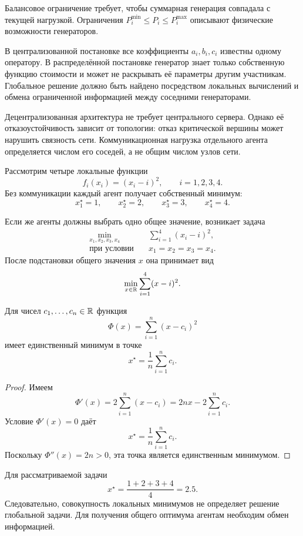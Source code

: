 Балансовое ограничение требует, чтобы суммарная генерация совпадала
с текущей нагрузкой. Ограничения
\(P_i^{\min}\le P_i\le P_i^{\max}\) описывают физические возможности
генераторов.

В централизованной постановке все коэффициенты \(a_i,b_i,c_i\)
известны одному оператору. В распределённой постановке генератор
знает только собственную функцию стоимости и может не раскрывать её
параметры другим участникам. Глобальное решение должно быть найдено
посредством локальных вычислений и обмена ограниченной информацией
между соседними генераторами.

Децентрализованная архитектура не требует центрального сервера.
Однако её отказоустойчивость зависит от топологии: отказ критической
вершины может нарушить связность сети. Коммуникационная нагрузка
отдельного агента определяется числом его соседей, а не общим числом
узлов сети.



Рассмотрим четыре локальные функции
\[
    f_i(x_i)=(x_i-i)^2,
    \qquad i=1,2,3,4.
\]
Без коммуникации каждый агент получает собственный минимум:
\[
    x_1^\star=1,
    \qquad
    x_2^\star=2,
    \qquad
    x_3^\star=3,
    \qquad
    x_4^\star=4.
\]

Если же агенты должны выбрать одно общее значение, возникает задача
\[
    \begin{aligned}
        \min_{x_1,x_2,x_3,x_4}
        \quad&
        \sum_{i=1}^{4}(x_i-i)^2,
        \\
        \text{при условии}
        \quad&
        x_1=x_2=x_3=x_4.
    \end{aligned}
\]
После подстановки общего значения \(x\) она принимает вид
\[
    \min_{x\in\mathbb{R}}
    \sum_{i=1}^{4}(x-i)^2.
\]

\begin{lemma}
Для чисел \(c_1,\ldots,c_n\in\mathbb{R}\) функция
\[
    \Phi(x)=\sum_{i=1}^{n}(x-c_i)^2
\]
имеет единственный минимум в точке
\[
    x^\star=\frac{1}{n}\sum_{i=1}^{n}c_i.
\]
\end{lemma}

\begin{proof}
Имеем
\[
    \Phi'(x)
    =
    2\sum_{i=1}^{n}(x-c_i)
    =
    2n x-2\sum_{i=1}^{n}c_i.
\]
Условие \(\Phi'(x)=0\) даёт
\[
    x^\star
    =
    \frac{1}{n}\sum_{i=1}^{n}c_i.
\]
Поскольку \(\Phi''(x)=2n>0\), эта точка является единственным
минимумом.
\end{proof}

Для рассматриваемой задачи
\[
    x^\star
    =
    \frac{1+2+3+4}{4}
    =
    2.5.
\]
Следовательно, совокупность локальных минимумов не определяет
решение глобальной задачи. Для получения общего оптимума агентам
необходим обмен информацией.

